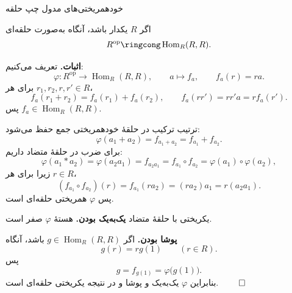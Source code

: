\begin{frame}[t]{خودهمریختی‌های مدول چپ حلقه}
    \label{lec12:regular-endomorphism}
    \begin{theorem}
        اگر $R$ یکدار باشد، آنگاه به‌صورت حلقه‌ای
        \[
            R^{\mathrm{op}}\ringcong\operatorname{Hom}_R(R,R).
        \]
    \end{theorem}
    \textbf{اثبات.} تعریف می‌کنیم:
    \[
        \varphi:R^{\mathrm{op}}\longrightarrow\operatorname{Hom}_R(R,R),
        \qquad a\longmapsto f_a,\qquad f_a(r)=ra.
    \]
    برای هر $r_1,r_2,r,r'\in R$،
    \[
        f_a(r_1+r_2)=f_a(r_1)+f_a(r_2),
        \qquad f_a(rr')=rr'a=r f_a(r').
    \]
    پس $f_a\in\operatorname{Hom}_R(R,R)$.
\end{frame}

\begin{frame}[t]{ترتیب ترکیب در حلقهٔ خودهمریختی}
    \label{lec12:regular-product}
    جمع حفظ می‌شود:
    \[
        \varphi(a_1+a_2)=f_{a_1+a_2}=f_{a_1}+f_{a_2}.
    \]
    برای ضرب در حلقهٔ متضاد داریم:
    \[
        \varphi(a_1*a_2)=\varphi(a_2a_1)=f_{a_2a_1}
        =f_{a_1}\circ f_{a_2}=\varphi(a_1)\circ\varphi(a_2),
    \]
    زیرا برای هر $r\in R$،
    \[
        (f_{a_1}\circ f_{a_2})(r)
        =f_{a_1}(ra_2)=(ra_2)a_1=r(a_2a_1).
    \]
    پس $\varphi$ همریختی حلقه‌ای است.
\end{frame}

\begin{frame}[t]{یکریختی با حلقهٔ متضاد}
    \label{lec12:regular-bijectivity}
    \textbf{یک‌به‌یک بودن.} هستهٔ $\varphi$ صفر است.
    \medskip

    \textbf{پوشا بودن.} اگر $g\in\operatorname{Hom}_R(R,R)$ باشد، آنگاه
    \[
        g(r)=r g(1)\qquad(r\in R).
    \]
    پس
    \[
        g=f_{g(1)}=\varphi\bigl(g(1)\bigr).
    \]
    بنابراین $\varphi$ یک‌به‌یک و پوشا و در نتیجه یکریختی حلقه‌ای است.
    \hfill$\qed$
\end{frame}

